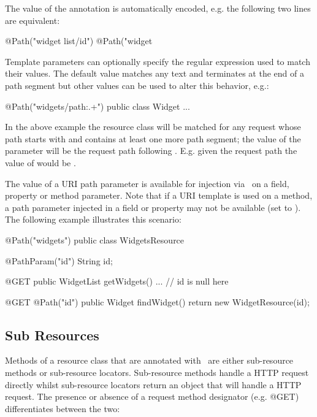 The value of the annotation is automatically encoded, e.g. the following two lines are equivalent:

\begin{listing}{1}
@Path("widget list/{id}")
@Path("widget%
\end{listing}

Template parameters can optionally specify the regular expression used to match their values. The default value matches any text and terminates at the end of a path segment but other values can be used to alter this behavior, e.g.:

\begin{listing}{1}
@Path("widgets/{path:.+}")
public class Widget {
  ...
}\end{listing}

In the above example the  resource class will be matched for any request whose path starts with  and contains at least one more path segment; the value of the  parameter will be the request path following . E.g. given the request path  the value of  would be .

The value of a URI path parameter is available for injection via \PathParam\ on a field, property or method parameter. Note that if a URI template is used on a method, a path parameter injected in a field or property may not be available (set to ). The following example illustrates this scenario:

\begin{listing}{1}
@Path("widgets")
public class WidgetsResource {
  @PathParam("id") String id;
  
  @GET
  public WidgetList getWidgets() {
    ...     // id is null here
  }
  
  @GET
  @Path("{id}")
  public Widget findWidget() {
    return new WidgetResource(id);
  }
}\end{listing}

\subsection{Sub Resources}
\label{sub_resources}

Methods of a resource class that are annotated with \Path\ are either sub-resource methods or sub-resource locators. Sub-resource methods handle a HTTP request directly whilst sub-resource locators return an object that will handle a HTTP request. The presence or absence of a request method designator (e.g. @GET) differentiates between the two:

